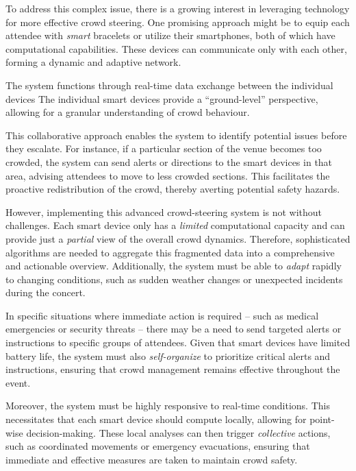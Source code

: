 To address this complex issue, 
 there is a growing interest in leveraging technology for more effective crowd steering. 
 One promising approach might be to equip each attendee with \emph{smart} bracelets or utilize their smartphones, 
 both of which have computational capabilities. 
 These devices can communicate only with each other, 
 forming a dynamic and adaptive network.

The system functions through real-time data exchange 
 between the individual devices %
 The individual smart devices provide a ``ground-level'' perspective, 
 allowing for a granular understanding of crowd behaviour.

This collaborative approach enables the system to identify potential issues before they escalate. 
 For instance, if a particular section of the venue becomes too crowded, 
 the system can send alerts or directions to the smart devices in that area, 
 advising attendees to move to less crowded sections. 
 This facilitates the proactive redistribution of the crowd, 
 thereby averting potential safety hazards.

However, implementing this advanced crowd-steering system is not without challenges. 
 Each smart device only has a \emph{limited} computational capacity 
 and can provide just a \emph{partial} view of the overall crowd dynamics. 
Therefore, sophisticated algorithms are needed to aggregate 
 this fragmented data into a comprehensive and actionable overview. 
 Additionally, the system must be able to \emph{adapt} rapidly to changing conditions, 
 such as sudden weather changes or unexpected incidents during the concert.

In specific situations where immediate action is required 
 -- such as medical emergencies or security threats -- 
 there may be a need to send targeted alerts or instructions to specific groups of attendees. 
 Given that smart devices have limited battery life, 
 the system must also \emph{self-organize} to prioritize critical alerts and instructions, 
 ensuring that crowd management remains effective throughout the event.

Moreover, the system must be highly responsive to real-time conditions. 
 This necessitates that each smart device should compute locally, 
 allowing for point-wise decision-making. 
 These local analyses can then trigger \emph{collective} actions, 
 such as coordinated movements or emergency evacuations, 
 ensuring that immediate and effective measures are taken to maintain crowd safety.

